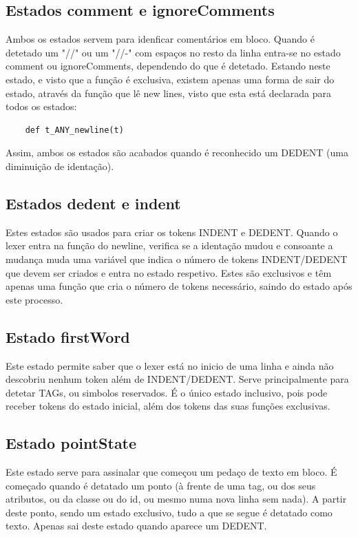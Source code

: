 \documentclass[11pt,a4paper]{report}%
\begin{document}
\subsection{Estados comment e ignoreComments}

Ambos os estados servem para idenficar comentários em bloco. Quando é detetado um "//" ou um "//-" com espaços no resto da linha entra-se no estado comment ou ignoreComments, dependendo do que é detetado. Estando neste estado, e visto que a função é exclusiva, existem apenas uma forma de sair do estado, através da função que lê new lines, visto que esta está declarada para todos os estados:

\begin{verbatim}
    def t_ANY_newline(t)
\end{verbatim}

Assim, ambos os estados são acabados quando é reconhecido um DEDENT (uma diminuição de identação).


\subsection{Estados dedent e indent}

Estes estados são usados para criar os tokens INDENT e DEDENT. Quando o lexer entra na função do newline, verifica se a identação mudou e consoante a mudança muda uma variável que indica o número de tokens INDENT/DEDENT que devem ser criados e entra no estado respetivo. Estes são exclusivos e têm apenas uma função que cria o número de tokens necessário, saindo do estado após este processo.

\subsection{Estado firstWord}

Este estado permite saber que o lexer está no inicio de uma linha e ainda não descobriu nenhum token além de INDENT/DEDENT. Serve principalmente para detetar TAGs, ou simbolos reservados. É o único estado inclusivo, pois pode receber tokens do estado inicial, além dos tokens das suas funções exclusivas.

\subsection{Estado pointState}

Este estado serve para assinalar que começou um pedaço de texto em bloco. É começado quando é detatado um ponto (à frente de uma tag, ou dos seus atributos, ou da classe ou do id, ou mesmo numa nova linha sem nada). A partir deste ponto, sendo um estado exclusivo, tudo a que se segue é detatado como texto. Apenas sai deste estado quando aparece um DEDENT.
\end{document}
